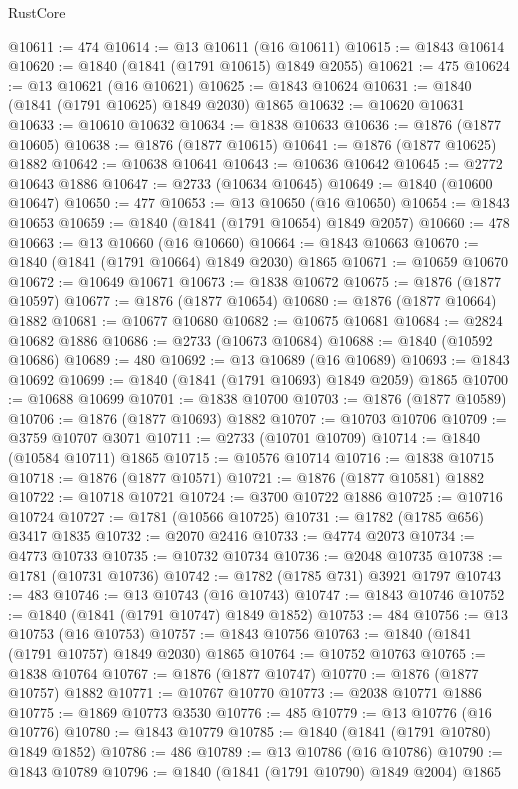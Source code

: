 \begin{lexlean}{RustCore}
\begin{coremodule}
@10611 := 474
@10614 := @13 @10611 (@16 @10611)
@10615 := @1843 @10614
@10620 := @1840 (@1841 (@1791 @10615) @1849 @2055)
@10621 := 475
@10624 := @13 @10621 (@16 @10621)
@10625 := @1843 @10624
@10631 := @1840 (@1841 (@1791 @10625) @1849 @2030) @1865
@10632 := @10620 @10631
@10633 := @10610 @10632
@10634 := @1838 @10633
@10636 := @1876 (@1877 @10605)
@10638 := @1876 (@1877 @10615)
@10641 := @1876 (@1877 @10625) @1882
@10642 := @10638 @10641
@10643 := @10636 @10642
@10645 := @2772 @10643 @1886
@10647 := @2733 (@10634 @10645)
@10649 := @1840 (@10600 @10647)
@10650 := 477
@10653 := @13 @10650 (@16 @10650)
@10654 := @1843 @10653
@10659 := @1840 (@1841 (@1791 @10654) @1849 @2057)
@10660 := 478
@10663 := @13 @10660 (@16 @10660)
@10664 := @1843 @10663
@10670 := @1840 (@1841 (@1791 @10664) @1849 @2030) @1865
@10671 := @10659 @10670
@10672 := @10649 @10671
@10673 := @1838 @10672
@10675 := @1876 (@1877 @10597)
@10677 := @1876 (@1877 @10654)
@10680 := @1876 (@1877 @10664) @1882
@10681 := @10677 @10680
@10682 := @10675 @10681
@10684 := @2824 @10682 @1886
@10686 := @2733 (@10673 @10684)
@10688 := @1840 (@10592 @10686)
@10689 := 480
@10692 := @13 @10689 (@16 @10689)
@10693 := @1843 @10692
@10699 := @1840 (@1841 (@1791 @10693) @1849 @2059) @1865
@10700 := @10688 @10699
@10701 := @1838 @10700
@10703 := @1876 (@1877 @10589)
@10706 := @1876 (@1877 @10693) @1882
@10707 := @10703 @10706
@10709 := @3759 @10707 @3071
@10711 := @2733 (@10701 @10709)
@10714 := @1840 (@10584 @10711) @1865
@10715 := @10576 @10714
@10716 := @1838 @10715
@10718 := @1876 (@1877 @10571)
@10721 := @1876 (@1877 @10581) @1882
@10722 := @10718 @10721
@10724 := @3700 @10722 @1886
@10725 := @10716 @10724
@10727 := @1781 (@10566 @10725)
@10731 := @1782 (@1785 @656) @3417 @1835
@10732 := @2070 @2416
@10733 := @4774 @2073
@10734 := @4773 @10733
@10735 := @10732 @10734
@10736 := @2048 @10735
@10738 := @1781 (@10731 @10736)
@10742 := @1782 (@1785 @731) @3921 @1797
@10743 := 483
@10746 := @13 @10743 (@16 @10743)
@10747 := @1843 @10746
@10752 := @1840 (@1841 (@1791 @10747) @1849 @1852)
@10753 := 484
@10756 := @13 @10753 (@16 @10753)
@10757 := @1843 @10756
@10763 := @1840 (@1841 (@1791 @10757) @1849 @2030) @1865
@10764 := @10752 @10763
@10765 := @1838 @10764
@10767 := @1876 (@1877 @10747)
@10770 := @1876 (@1877 @10757) @1882
@10771 := @10767 @10770
@10773 := @2038 @10771 @1886
@10775 := @1869 @10773 @3530
@10776 := 485
@10779 := @13 @10776 (@16 @10776)
@10780 := @1843 @10779
@10785 := @1840 (@1841 (@1791 @10780) @1849 @1852)
@10786 := 486
@10789 := @13 @10786 (@16 @10786)
@10790 := @1843 @10789
@10796 := @1840 (@1841 (@1791 @10790) @1849 @2004) @1865

\end{coremodule}
\end{lexlean}
